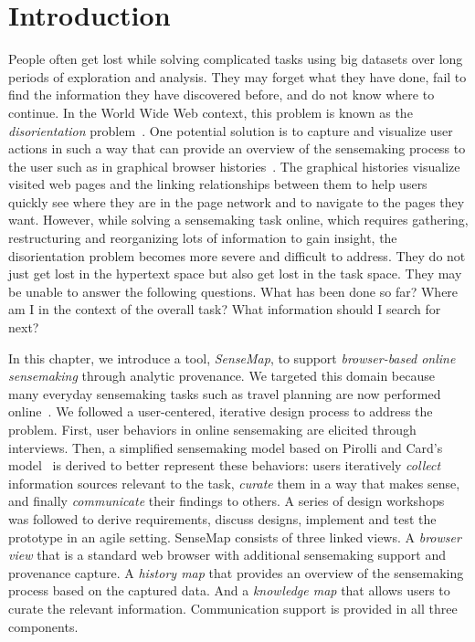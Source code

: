 \section{Introduction}
People often get lost while solving complicated tasks using big datasets over long periods of exploration and analysis. They may forget what they have done, fail to find the information they have discovered before, and do not know where to continue. In the World Wide Web context, this problem is known as the \textit{disorientation} problem~\cite{Conklin1987}. One potential solution is to capture and visualize user actions in such a way that can provide an overview of the sensemaking process to the user such as in graphical browser histories~\cite{Ayers1995,Hightower1998,Milic-Frayling2003}. The graphical histories visualize visited web pages and the linking relationships between them to help users quickly see where they are in the page network and to navigate to the pages they want. However, while solving a sensemaking task online, which requires gathering, restructuring and reorganizing lots of information to gain insight, the disorientation problem becomes more severe and difficult to address. They do not just get lost in the hypertext space but also get lost in the task space. They may be unable to answer the following questions. What has been done so far? Where am I in the context of the overall task? What information should I search for next?

In this chapter, we introduce a tool, \emph{SenseMap}, to support \textit{browser-based online sensemaking} through analytic provenance. We targeted this domain because many everyday sensemaking tasks such as travel planning are now performed online~\cite{Russell2008}.
We followed a user-centered, iterative design process to address the problem. First, user behaviors in online sensemaking are elicited through interviews. Then, a simplified sensemaking model based on Pirolli and Card's model~\cite{Pirolli2005} is derived to better represent these behaviors: users iteratively \textit{collect} information sources relevant to the task, \textit{curate} them in a way that makes sense, and finally \textit{communicate} their findings to others. A series of design workshops was followed to derive requirements, discuss designs, implement and test the prototype in an agile setting. SenseMap consists of three linked views. A \emph{browser view} that is a standard web browser with additional sensemaking support and provenance capture. A \emph{history map} that provides an overview of the sensemaking process based on the captured data. And a \emph{knowledge map} that allows users to curate the relevant information. Communication support is provided in all three components.

